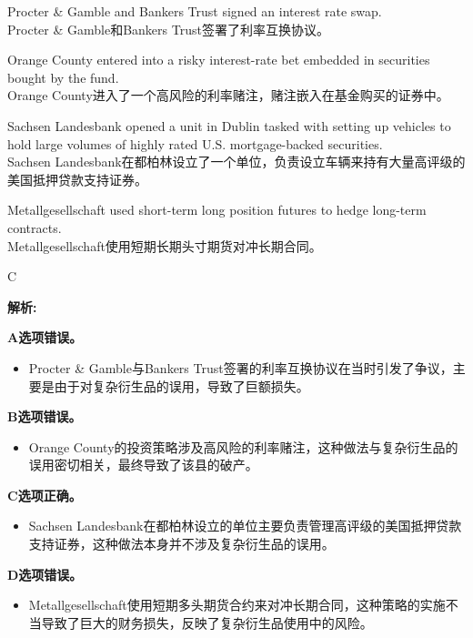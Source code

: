 \documentclass{article}
\newenvironment{explanation}
{\textbf{解析:}\par}
{\par}
\begin{document}
    \begin{choices}
        \item Procter \& Gamble and Bankers Trust signed an interest rate swap.  \\
        Procter \& Gamble和Bankers Trust签署了利率互换协议。
        \item Orange County entered into a risky interest-rate bet embedded in securities bought by the fund.  \\
        Orange County进入了一个高风险的利率赌注，赌注嵌入在基金购买的证券中。
        \item Sachsen Landesbank opened a unit in Dublin tasked with setting up vehicles to hold large volumes of highly rated U.S. mortgage-backed securities.  \\
        Sachsen Landesbank在都柏林设立了一个单位，负责设立车辆来持有大量高评级的美国抵押贷款支持证券。
        \item Metallgesellschaft used short-term long position futures to hedge long-term contracts.  \\
        Metallgesellschaft使用短期长期头寸期货对冲长期合同。
    \end{choices}
    
    \begin{correctanswer}
    C
    \end{correctanswer}
    
    \begin{explanation}
        \textbf{A选项错误。}
        \begin{itemize}
            \item Procter \& Gamble与Bankers Trust签署的利率互换协议在当时引发了争议，主要是由于对复杂衍生品的误用，导致了巨额损失。
        \end{itemize}
    
        \textbf{B选项错误。}
        \begin{itemize}
            \item Orange County的投资策略涉及高风险的利率赌注，这种做法与复杂衍生品的误用密切相关，最终导致了该县的破产。
        \end{itemize}
    
        \textbf{C选项正确。}
        \begin{itemize}
            \item Sachsen Landesbank在都柏林设立的单位主要负责管理高评级的美国抵押贷款支持证券，这种做法本身并不涉及复杂衍生品的误用。
        \end{itemize}
    
        \textbf{D选项错误。}
        \begin{itemize}
            \item Metallgesellschaft使用短期多头期货合约来对冲长期合同，这种策略的实施不当导致了巨大的财务损失，反映了复杂衍生品使用中的风险。
        \end{itemize}
    \end{explanation}
    
\end{document}
